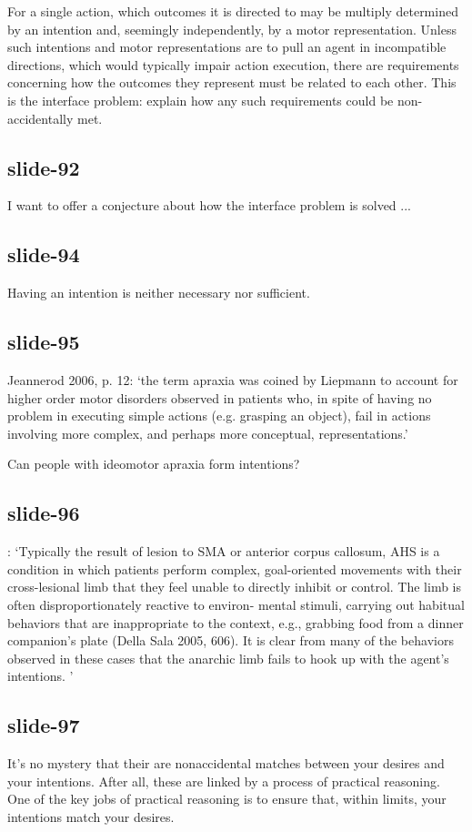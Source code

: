 \documentclass[12pt,\papersize]{extarticle}
\begin{document}
For a single action, which outcomes it is directed to may be multiply
determined by an intention and, seemingly independently, by a motor
representation. Unless such intentions and motor representations are to pull
an agent in incompatible directions, which would typically impair action
execution, there are requirements concerning how the outcomes they represent
must be related to each other. This is the interface problem: explain how any
such requirements could be non-accidentally met.

\subsection{slide-92}
I want to offer a conjecture about how the interface problem is solved ...

\subsection{slide-94}
Having an intention is neither necessary nor sufficient.

\subsection{slide-95}
Jeannerod 2006, p. 12:
‘the term apraxia was coined by Liepmann to account for higher order motor
disorders observed in patients who, in spite of having no problem in executing
simple actions (e.g. grasping an object), fail in actions involving more
complex, and perhaps more conceptual, representations.’

Can people with ideomotor apraxia form intentions?

\subsection{slide-96}
\citep[p.~7]{mylopoulos:2016_intentions}: ‘Typically the result of lesion
to SMA or anterior corpus callosum, AHS is a condition in which patients
perform complex, goal-oriented movements with their cross-lesional limb
that they feel unable to directly inhibit or control. The limb is often
disproportionately reactive to environ- mental stimuli, carrying out
habitual behaviors that are inappropriate to the context, e.g., grabbing
food from a dinner companion’s plate (Della Sala 2005, 606). It is clear
from many of the behaviors observed in these cases that the anarchic limb
fails to hook up with the agent’s intentions. ’

\subsection{slide-97}
It’s no mystery that their are nonaccidental matches between your desires and your
intentions. After all, these are linked by a process of practical reasoning. One of the
key jobs of practical reasoning is to ensure that, within limits, your intentions match
your desires.
\end{document}
